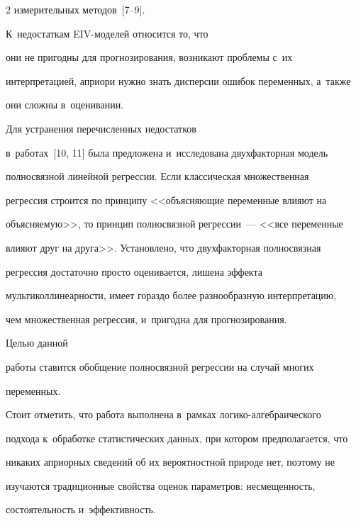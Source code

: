 \begin{multicols}{2}
измерительных методов~[7--9]. 





К~недостаткам EIV-моделей относится то, что 


они не пригодны для прогнозирования, возникают проблемы с~их 


интерпретацией, априори нужно знать дисперсии ошибок переменных, а~также 


они сложны в~оценивании. 





Для устранения перечисленных недостатков 


в~работах~[10, 11] была предложена и~исследована двухфакторная модель 


полносвязной линейной регрессии. Если классическая множественная 


регрессия строится по принципу <<объясняющие переменные влияют на 


объясняемую>>, то принцип полносвязной регрессии~--- <<все переменные 


влияют друг на друга>>. Уста\-нов\-ле\-но, что двухфакторная полносвязная 


регрессия достаточно просто оценивается, лишена эффекта 


мультиколлинеарности, имеет гораздо более разнообразную интерпретацию, 


чем множественная регрессия, и~пригодна для прогнозирования. 





Целью данной 


работы ставится обобщение полносвязной регрессии на случай многих 


переменных.








    


    Стоит отметить, что работа выполнена в~рамках ло\-ги\-ко-ал\-геб\-раи\-че\-ско\-го 


подхода к~обработке статистических данных, при котором предполагается, что 


никаких априорных сведений об их вероятностной природе нет, поэтому не 


изучаются традиционные свойства оценок параметров: несмещенность, 


состоятельность и~эффективность.






\end{multicols}
